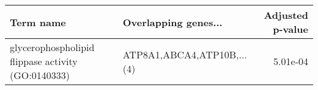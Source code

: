 \begin{tabular}{llr}
\toprule
                                         Term name &       Overlapping genes... &  Adjusted p-value \\
\midrule
glycerophospholipid flippase activity (GO:0140333) & ATP8A1,ABCA4,ATP10B,...(4) &          5.01e-04 \\
\bottomrule
\end{tabular}

